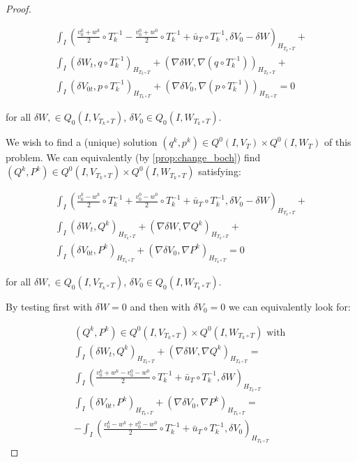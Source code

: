 \documentclass[english,a4paper,10pt,oneside]{scrbook}	%
\theoremstyle{break}
\newenvironment{mproof}[1][\proofname]{%
  \begin{proof}[#1]$ $\par\nobreak\ignorespaces
}{%
  \end{proof}
}
\renewcommand*{\proofname}{Proof}
\theoremstyle{remark}
\begin{document}
\begin{mproof}
\begin{align*}
\int_I \left (\frac{v_0^k+w^k}{2}\circ T_k^{-1}- \frac{v_0^0+w^0}{2}\circ T_k^{-1}+\bar{u}_T\circ T_k^{-1} ,\delta V_0-\delta W\right)_{H_{T_k \circ T}}+\\
\int_I ( \delta W_t , q\circ T_k^{-1})_{H_{T_k \circ T}}+ (\nabla\delta W, \nabla( q\circ T_k^{-1}))_{H_{T_k \circ T}}+\\
\int_I ( \delta V_{0t},p \circ T_k^{-1})_{H_{T_k \circ T}} + ( \nabla \delta V_0, \nabla (p\circ T_k^{-1}))_{H_{T_k \circ T}} = 0
\end{align*}

for all $\delta W, \in Q_0(I, V_{T_k \circ T})$, $ \delta V_{0} \in Q_0(I,W_{T_k \circ T})$.

We wish to find a (unique) solution $(q^k, p^k) \in Q^0(I, V_T)\times Q^0(I, W_T)$ of this problem. We can equivalently (by \cref{prop:change_boch}) find $(Q^k, P^k) \in Q^0(I, V_{T_k \circ T})\times Q^0(I, W_{T_k \circ T})$ satisfying:

\begin{align*}
\int_I \left (\frac{v_0^k-w^k}{2}\circ T_k^{-1}+ \frac{v_0^0-w^0}{2}\circ T_k^{-1}+\bar{u}_T\circ T_k^{-1} ,\delta V_0-\delta W\right)_{H_{T_k \circ T}}+\\
\int_I (\delta W_t ,Q^k )_{H_{T_k \circ T}}+ (\nabla \delta W, \nabla Q^k)_{H_{T_k \circ T}}+\\
\int_I( \delta V_{0t},P^k)_{H_{T_k \circ T}} + ( \nabla \delta V_0, \nabla P^k)_{H_{T_k \circ T}} = 0
\end{align*}

for all $\delta W, \in Q_0(I, V_{T_k \circ T})$, $ \delta V_{0} \in Q_0(I,W_{T_k \circ T})$.

By testing first with $\delta W=0$ and then with $\delta V_0=0$ we can equivalently look for:

\begin{align*}
(Q^k, P^k) \in Q^0(I, V_{T_k \circ T})\times Q^0(I, W_{T_k \circ T}) \text{ with }\\
\int_I (\delta W_t ,Q^k)_{H_{T_k \circ T}}+ (\nabla \delta W, \nabla Q^k)_{H_{T_k \circ T}} =\\ \int_I \left (\frac{v_0^k+w^k-v_0^0-w^0}{2}\circ T_k^{-1}+\bar{u}_T\circ T_k^{-1} ,\delta W\right)_{H_{T_k \circ T}}\\
\int_I ( \delta V_{0t},P^k)_{H_{T_k \circ T}}+ ( \nabla \delta V_0, \nabla P^k)_{H_{T_k \circ T}} =\\- \int_I \left (\frac{v_0^k-w^k+v_0^0-w^0}{2}\circ T_k^{-1}+\bar{u}_T\circ T_k^{-1} ,\delta V_0\right)_{H_{T_k \circ T}}
\end{align*}


\end{mproof}
\end{document}
